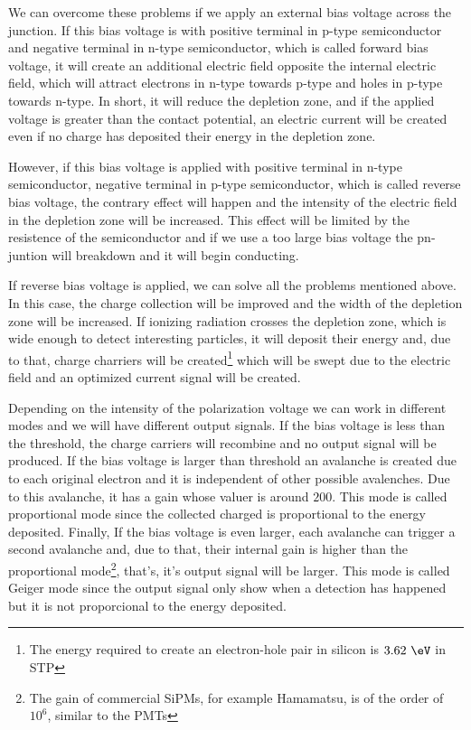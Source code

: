 We can overcome these problems if we apply an external bias voltage across the junction. If this bias voltage is with positive terminal in p-type semiconductor and negative terminal in n-type semiconductor, which is called forward bias voltage, it will create an additional electric field opposite the internal electric field, which will attract electrons in n-type towards p-type and holes in p-type towards n-type. In short, it will reduce the depletion zone, and if the applied voltage is greater than the contact potential, an electric current will be created even if no charge has deposited their energy in the depletion zone.

However, if this bias voltage is applied with positive terminal in n-type semiconductor, negative terminal in p-type semiconductor, which is called reverse bias voltage, the contrary effect will happen and the intensity of the electric field in the depletion zone will be increased. This effect will be limited by the resistence of the semiconductor and if we use a too large bias voltage the pn-juntion will breakdown and it will begin conducting. 

If reverse bias voltage is applied, we can solve all the problems mentioned above. In this case, the charge collection will be improved and the width of the depletion zone will be increased. If ionizing radiation crosses the depletion zone, which is wide enough to detect interesting particles, it will deposit their energy and, due to that, charge charriers will be created\footnote{The energy required to create an electron-hole pair in silicon is $3.62~\eV$ in STP\cite{Leo}} which will be swept due to the electric field and an optimized current signal will be created. 

Depending on the intensity of the polarization voltage we can work in different modes and we will have different output signals. If the bias voltage is less than the threshold, the charge carriers will recombine and no output signal will be produced. If the bias voltage is larger than threshold an avalanche is created due to each original electron and it is independent of other possible avalenches. Due to this avalanche, it has a gain whose valuer is around $200$. This mode is called proportional mode since the collected charged is proportional to the energy deposited. Finally, If the bias voltage is even larger, each avalanche can trigger a second avalanche and, due to that, their internal gain is higher than the proportional mode\footnote{The gain of commercial SiPMs, for example Hamamatsu, is of the order of $10^6$, similar to the PMTs}, that's, it's output signal will be larger. This mode is called Geiger mode since the output signal only show when a detection has happened but it is not proporcional to the energy deposited. 

